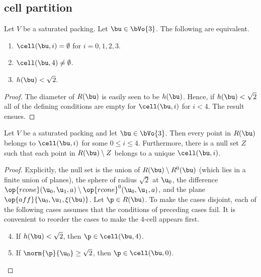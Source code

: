 \begin{cnl}
\bigskip
\subsection{cell partition}\label{cell partition}


\begin{lemma}[]
\label{lemma:M-complement4} 
%
Let $V$ be a saturated packing.  Let $\bu\in \bVo{3}$.
The following  are equivalent.
\begin{enumerate} 
\item  $\cell(\bu,i)=\emptyset$ for $i=0,1,2,3$.
\item  $\cell(\bu,4)\ne\emptyset$.
\item  $h(\bu)<\sqrt2$.
\end{enumerate}
\end{lemma}


\begin{proof} 
  The diameter of $R(\bu)$ is easily seen to be $h(\bu)$.  Hence, if
  $h(\bu)<\sqrt2$ all of the defining conditions are empty for
  $\cell(\bu,i)$ for $i<4$.  The result ensues.
\end{proof}


\begin{lemma}[]
\label{lemma:M-exhaust} 
%
Let $V$ be a saturated packing and let $\bu\in \bVo{3}$. Then every
point in $R(\bu)$ belongs to $\cell(\bu,i)$ for some $0\le i\le 4$.
Furthermore, there is a null set $Z$ such that each point in
$R(\bu)\setminus Z$ belongs to a unique $\cell(\bu,i)$.
\end{lemma}


\begin{proof} 
  Explicitly, the null set is the union of $R(\bu)\setminus R^0(\bu)$
  (which lies in a finite union of planes), the sphere of radius
  $\sqrt2$ at $\u_0$, the difference $\op{rcone}(\u_0,\u_1,a)\setminus
  \op{rcone}^0(\u_0,\u_1,a)$, and the plane
  $\op{aff}\braced{\u_0,\u_1,\xi(\bu)}$.  Let $\p\in R(\bu)$.  To make the
  cases disjoint, each of the following cases assumes that the
  conditions of preceding cases fail.  It is convenient to reorder the
  cases to make the $4$-cell appears first.
\begin{enumerate}
\setcounter{enumi}{3}
\item %
If $h(\bu)<\sqrt2$,  then $\p\in\cell(\bu,4)$.

\setcounter{enumi}{-1}
\item %
If $\norm{\p}{\u_0} \ge\sqrt2$,  then $\p\in\cell(\bu,0)$.


\end{enumerate}
\end{proof}
\end{cnl}

